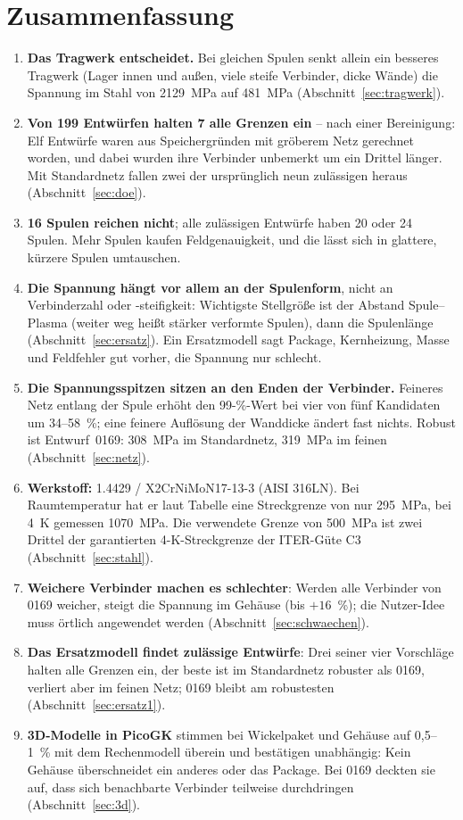 \documentclass[10pt,a4paper]{article}
\begin{document}
\section{Zusammenfassung}
\begin{enumerate}\itemsep2pt
\item \textbf{Das Tragwerk entscheidet.} Bei gleichen Spulen senkt allein ein besseres Tragwerk (Lager innen und
außen, viele steife Verbinder, dicke Wände) die Spannung im Stahl von \SI{2129}{MPa} auf \SI{481}{MPa}
(Abschnitt~\ref{sec:tragwerk}).
\item \textbf{Von 199 Entwürfen halten 7 alle Grenzen ein} -- nach einer Bereinigung: Elf Entwürfe waren aus
Speichergründen mit gröberem Netz gerechnet worden, und dabei wurden ihre Verbinder unbemerkt um ein Drittel länger.
Mit Standardnetz fallen zwei der ursprünglich neun zulässigen heraus (Abschnitt~\ref{sec:doe}).
\item \textbf{16 Spulen reichen nicht}; alle zulässigen Entwürfe haben 20 oder 24 Spulen. Mehr Spulen kaufen
Feldgenauigkeit, und die lässt sich in glattere, kürzere Spulen umtauschen.
\item \textbf{Die Spannung hängt vor allem an der Spulenform}, nicht an Verbinderzahl oder -steifigkeit: Wichtigste
Stellgröße ist der Abstand Spule--Plasma (weiter weg heißt stärker verformte Spulen), dann die Spulenlänge
(Abschnitt~\ref{sec:ersatz}). Ein Ersatzmodell sagt Package, Kernheizung, Masse und Feldfehler gut vorher, die
Spannung nur schlecht.
\item \textbf{Die Spannungsspitzen sitzen an den Enden der Verbinder.} Feineres Netz entlang der Spule erhöht den
99-\%-Wert bei vier von fünf Kandidaten um 34--58~\%; eine feinere Auflösung der Wanddicke ändert fast nichts.
Robust ist Entwurf~0169: \SI{308}{MPa} im Standardnetz, \SI{319}{MPa} im feinen (Abschnitt~\ref{sec:netz}).
\item \textbf{Werkstoff:} 1.4429 / X2CrNiMoN17-13-3 (AISI 316LN). Bei Raumtemperatur hat er laut Tabelle eine
Streckgrenze von nur \SI{295}{MPa}, bei \SI{4}{K} gemessen \SI{1070}{MPa}. Die verwendete Grenze von
\SI{500}{MPa} ist zwei Drittel der garantierten 4-K-Streckgrenze der ITER-Güte C3 (Abschnitt~\ref{sec:stahl}).
\item \textbf{Weichere Verbinder machen es schlechter}: Werden alle Verbinder von 0169 weicher, steigt die Spannung im
Gehäuse (bis $+16$~\%); die Nutzer-Idee muss örtlich angewendet werden (Abschnitt~\ref{sec:schwaechen}).
\item \textbf{Das Ersatzmodell findet zulässige Entwürfe}: Drei seiner vier Vorschläge halten alle Grenzen ein, der
beste ist im Standardnetz robuster als 0169, verliert aber im feinen Netz; 0169 bleibt am robustesten
(Abschnitt~\ref{sec:ersatz1}).
\item \textbf{3D-Modelle in PicoGK} stimmen bei Wickelpaket und Gehäuse auf 0,5--1~\% mit dem Rechenmodell überein
und bestätigen unabhängig: Kein Gehäuse überschneidet ein anderes oder das Package. Bei 0169 deckten sie auf, dass
sich benachbarte Verbinder teilweise durchdringen (Abschnitt~\ref{sec:3d}).
\end{enumerate}
\end{document}
